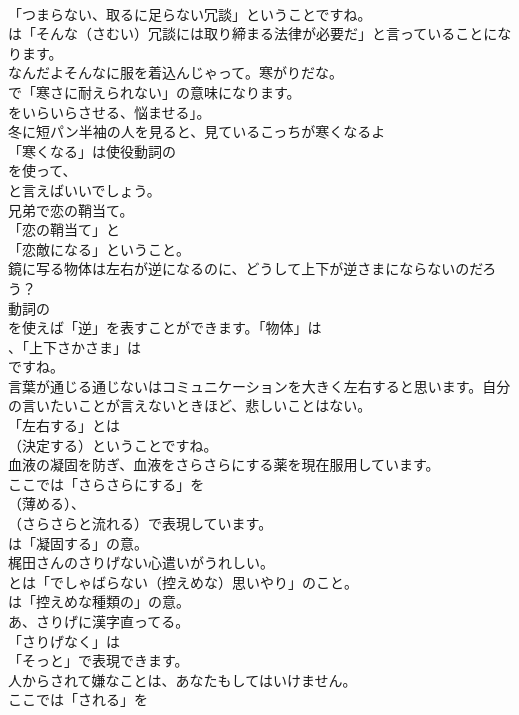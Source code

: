 \documentclass[8pt]{extreport}
\begin{document}
\begin{CJK}{UTF8}{min}
\\	「つまらない、取るに足らない冗談」ということですね。
\\	は「そんな（さむい）冗談には取り締まる法律が必要だ」と言っていることになります。	
\\	なんだよそんなに服を着込んじゃって。寒がりだな。 
\\	で「寒さに耐えられない」の意味になります。
\\	をいらいらさせる、悩ませる」。	
\\	冬に短パン半袖の人を見ると、見ているこっちが寒くなるよ 
\\	「寒くなる」は使役動詞の
\\	を使って、
\\	と言えばいいでしょう。	
\\	兄弟で恋の鞘当て。 
\\	「恋の鞘当て」と
\\	「恋敵になる」ということ。	
\\	鏡に写る物体は左右が逆になるのに、どうして上下が逆さまにならないのだろう？ 
\\	動詞の
\\	を使えば「逆」を表すことができます。「物体」は
\\	、「上下さかさま」は
\\	ですね。	
\\	言葉が通じる通じないはコミュニケーションを大きく左右すると思います。自分の言いたいことが言えないときほど、悲しいことはない。 
\\	「左右する」とは 
\\	（決定する）ということですね。	
\\	血液の凝固を防ぎ、血液をさらさらにする薬を現在服用しています。 
\\	ここでは「さらさらにする」を 
\\	（薄める）、
\\	（さらさらと流れる）で表現しています。
\\	は「凝固する」の意。	
\\	梶田さんのさりげない心遣いがうれしい。 
\\	とは「でしゃばらない（控えめな）思いやり」のこと。
\\	は「控えめな種類の」の意。	
\\	あ、さりげに漢字直ってる。 
\\	「さりげなく」は
\\	「そっと」で表現できます。	
\\	人からされて嫌なことは、あなたもしてはいけません。 
\\	ここでは「される」を 

\end{CJK}
\end{document}
